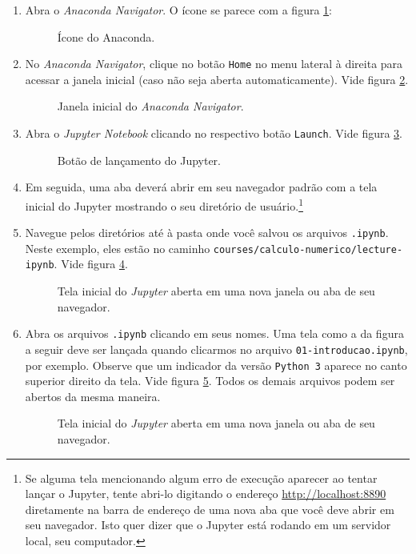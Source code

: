 \documentclass[a4paper,12pt]{article}
\begin{document}
\begin{enumerate}
\item
  Abra o \emph{Anaconda Navigator}. O ícone se parece com a figura \ref{fig:icon}:
\begin{figure}[h!]
\centering
\caption{\label{fig:icon}Ícone do Anaconda.}
\end{figure}  
\item
  No \emph{Anaconda Navigator}, clique no botão \texttt{Home} no menu
  lateral à direita para acessar a janela inicial (caso não seja aberta
  automaticamente). Vide figura \ref{fig:home}.
\begin{figure}[h!]
\centering
\caption{\label{fig:home}Janela inicial do \emph{Anaconda Navigator}.}
\end{figure}  
\item
  Abra o \emph{Jupyter Notebook} clicando no respectivo botão
  \texttt{Launch}. Vide figura \ref{fig:launch}.
  \begin{figure}[h!]
\centering
\caption{\label{fig:launch}Botão de lançamento do Jupyter.}
\end{figure}  
\item
  Em seguida, uma aba deverá abrir em seu navegador padrão com a tela
  inicial do Jupyter mostrando o seu diretório de
  usuário.\footnote{Se alguma tela mencionando algum erro de execução aparecer ao tentar lançar o Jupyter, tente abri-lo digitando o endereço \url{http://localhost:8890} diretamente na barra de endereço de uma nova aba que você deve abrir em seu navegador. Isto quer dizer que o Jupyter está rodando em um servidor local, seu computador.}
\item
  Navegue pelos diretórios até à pasta onde você salvou os arquivos
  \texttt{.ipynb}. Neste exemplo, eles estão no caminho
  \texttt{courses/calculo-numerico/lecture-ipynb}. Vide figura \ref{fig:jupyter}.
\begin{figure}[h!]
\centering
\caption{\label{fig:jupyter}Tela inicial do \emph{Jupyter} aberta em uma nova janela ou aba de seu navegador.}
\end{figure}  
\item
  Abra os arquivos \texttt{.ipynb} clicando em seus nomes. Uma tela como
  a da figura a seguir deve ser lançada quando clicarmos no arquivo
  \texttt{01-introducao.ipynb}, por exemplo. Observe que um indicador da versão \texttt{Python 3} aparece no canto superior direito da tela. Vide figura \ref{fig:intro}. Todos os demais arquivos podem ser abertos da mesma maneira. 
  \begin{figure}[h!]
\centering
\caption{\label{fig:intro}Tela inicial do \emph{Jupyter} aberta em uma nova janela ou aba de seu navegador.}
\end{figure}  
\end{enumerate}
\end{document}
